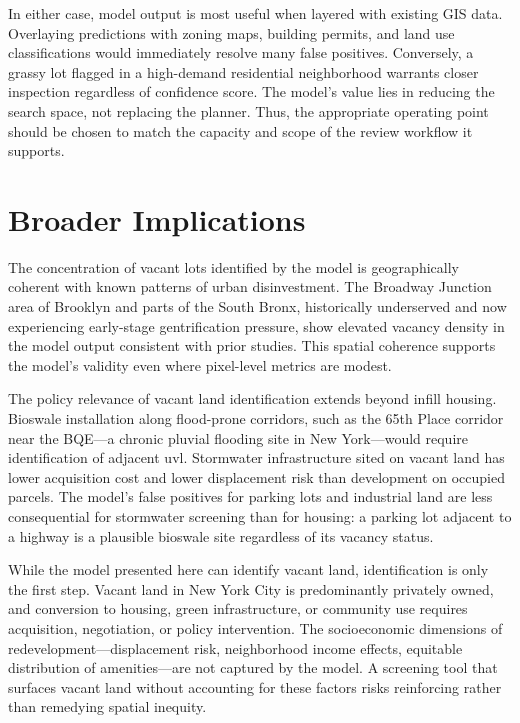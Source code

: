 In either case, model output is most useful when layered with existing GIS data. Overlaying predictions with zoning maps, building permits, and land use classifications would immediately resolve many false positives. Conversely, a grassy lot flagged in a high-demand residential neighborhood warrants closer inspection regardless of confidence score. The model's value lies in reducing the search space, not replacing the planner. Thus, the appropriate operating point should be chosen to match the capacity and scope of the review workflow it supports.

\section{Broader Implications}
\label{sec:implications}

The concentration of vacant lots identified by the model is geographically coherent with known patterns of urban disinvestment. The Broadway Junction area of Brooklyn and parts of the South Bronx, historically underserved and now experiencing early-stage gentrification pressure, show elevated vacancy density in the model output consistent with prior studies. This spatial coherence supports the model's validity even where pixel-level metrics are modest.

The policy relevance of vacant land identification extends beyond infill housing. Bioswale installation along flood-prone corridors, such as the 65th Place corridor near the BQE---a chronic pluvial flooding site in New York---would require identification of adjacent \acrshort{uvl}. Stormwater infrastructure sited on vacant land has lower acquisition cost and lower displacement risk than development on occupied parcels. The model's false positives for parking lots and industrial land are less consequential for stormwater screening than for housing: a parking lot adjacent to a highway is a plausible bioswale site regardless of its vacancy status.

While the model presented here can identify vacant land, identification is only the first step. Vacant land in New York City is predominantly privately owned, and conversion to housing, green infrastructure, or community use requires acquisition, negotiation, or policy intervention. The socioeconomic dimensions of redevelopment---displacement risk, neighborhood income effects, equitable distribution of amenities---are not captured by the model. A screening tool that surfaces vacant land without accounting for these factors risks reinforcing rather than remedying spatial inequity.

